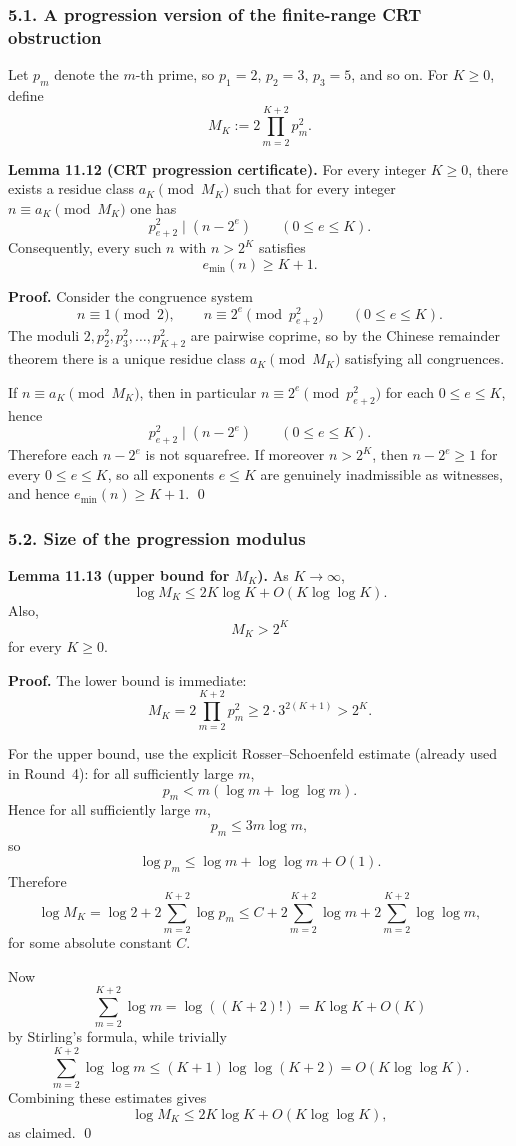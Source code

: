 \subsubsection{5.1. A progression version of the finite-range CRT obstruction}
Let $p_m$ denote the $m$-th prime, so $p_1=2$, $p_2=3$, $p_3=5$, and so on. For $K\ge 0$, define
\[
 M_K:=2\prod_{m=2}^{K+2} p_m^2.
\]

\textbf{Lemma 11.12 (CRT progression certificate).}
For every integer $K\ge 0$, there exists a residue class $a_K\pmod{M_K}$ such that for every integer $n\equiv a_K\pmod{M_K}$ one has
\[
 p_{e+2}^2\mid (n-2^e)\qquad (0\le e\le K).
\]
Consequently, every such $n$ with $n>2^K$ satisfies
\[
 e_{\min}(n)\ge K+1.
\]

\textbf{Proof.}
Consider the congruence system
\[
 n\equiv 1\pmod 2,
 \qquad
 n\equiv 2^e\pmod{p_{e+2}^2}
 \qquad (0\le e\le K).
\]
The moduli $2,p_2^2,p_3^2,\dots,p_{K+2}^2$ are pairwise coprime, so by the Chinese remainder theorem there is a unique residue class $a_K\pmod{M_K}$ satisfying all congruences.

If $n\equiv a_K\pmod{M_K}$, then in particular $n\equiv 2^e\pmod{p_{e+2}^2}$ for each $0\le e\le K$, hence
\[
 p_{e+2}^2\mid (n-2^e)
 \qquad (0\le e\le K).
\]
Therefore each $n-2^e$ is not squarefree. If moreover $n>2^K$, then $n-2^e\ge 1$ for every $0\le e\le K$, so all exponents $e\le K$ are genuinely inadmissible as witnesses, and hence $e_{\min}(n)\ge K+1$. \qed

\subsubsection{5.2. Size of the progression modulus}

\textbf{Lemma 11.13 (upper bound for $M_K$).}
As $K\to\infty$,
\[
 \log M_K\le 2K\log K+O(K\log\log K).
\]
Also,
\[
 M_K>2^K
\]
for every $K\ge 0$.

\textbf{Proof.}
The lower bound is immediate:
\[
 M_K=2\prod_{m=2}^{K+2}p_m^2\ge 2\cdot 3^{2(K+1)}>2^K.
\]

For the upper bound, use the explicit Rosser--Schoenfeld estimate (already used in Round~4): for all sufficiently large $m$,
\[
 p_m<m(\log m+\log\log m).
\]
Hence for all sufficiently large $m$,
\[
 p_m\le 3m\log m,
\]
so
\[
 \log p_m\le \log m+\log\log m+O(1).
\]
Therefore
\[
 \log M_K
=\log 2+2\sum_{m=2}^{K+2}\log p_m
\le C+2\sum_{m=2}^{K+2}\log m+2\sum_{m=2}^{K+2}\log\log m,
\]
for some absolute constant $C$.

Now
\[
 \sum_{m=2}^{K+2}\log m=\log((K+2)!)=K\log K+O(K)
\]
by Stirling's formula, while trivially
\[
 \sum_{m=2}^{K+2}\log\log m\le (K+1)\log\log(K+2)=O(K\log\log K).
\]
Combining these estimates gives
\[
 \log M_K\le 2K\log K+O(K\log\log K),
\]
as claimed. \qed

